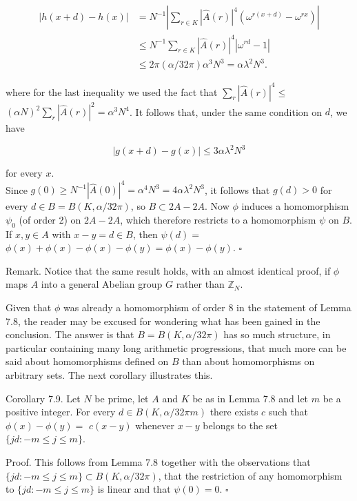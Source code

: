 \documentclass[10pt]{article}
\begin{document}
$$
\begin{aligned}
|h(x+d)-h(x)|
&=N^{-1}\left|\sum_{r\in K}|\hat{A}(r)|^{4}
  \left(\omega^{r(x+d)}-\omega^{rx}\right)\right| \\
&\leqslant N^{-1}\sum_{r\in K}|\hat{A}(r)|^{4}
  \left|\omega^{rd}-1\right| \\
&\leqslant 2\pi(\alpha/32\pi)\alpha^{3}N^{3}
 =\alpha\lambda^{2}N^{3}.
\end{aligned}
$$

where for the last inequality we used the fact that $\sum_{r}|\hat{A}(r)|^{4} \leqslant$ $(\alpha N)^{2} \sum_{r}|\hat{A}(r)|^{2}=\alpha^{3} N^{4}$. It follows that, under the same condition on $d$, we have

$$
|g(x+d)-g(x)| \leqslant 3 \alpha \lambda^{2} N^{3}
$$

for every $x$.\\
Since $g(0) \geqslant N^{-1}|\hat{A}(0)|^{4}=\alpha^{4} N^{3}=4 \alpha \lambda^{2} N^{3}$, it follows that $g(d)>0$ for every $d \in B=B(K, \alpha / 32 \pi)$, so $B \subset 2 A-2 A$. Now $\phi$ induces a homomorphism $\psi_{0}$ (of order 2) on $2 A-2 A$, which therefore restricts to a homomorphism $\psi$ on $B$. If $x, y \in A$ with $x-y=d \in B$, then $\psi(d)=$ $\phi(x)+\phi(x)-\phi(x)-\phi(y)=\phi(x)-\phi(y)$. \(\square\)

Remark. Notice that the same result holds, with an almost identical proof, if $\phi$ maps $A$ into a general Abelian group $G$ rather than $\mathbb{Z}_{N}$.

Given that $\phi$ was already a homomorphism of order 8 in the statement of Lemma 7.8, the reader may be excused for wondering what has been gained in the conclusion. The answer is that $B=B(K, \alpha / 32 \pi)$ has so much structure, in particular containing many long arithmetic progressions, that much more can be said about homomorphisms defined on $B$ than about homomorphisms on arbitrary sets. The next corollary illustrates this.

Corollary 7.9. Let $N$ be prime, let $A$ and $K$ be as in Lemma 7.8 and let $m$ be a positive integer. For every $d \in B(K, \alpha / 32 \pi m)$ there exists $c$ such that $\phi(x)-\phi(y)=$ $c(x-y)$ whenever $x-y$ belongs to the set $\{j d:-m \leqslant j \leqslant m\}$.

Proof. This follows from Lemma 7.8 together with the observations that $\{j d:-m \leqslant j \leqslant m\} \subset B(K, \alpha / 32 \pi)$, that the restriction of any homomorphism to $\{j d:-m \leqslant j \leqslant m\}$ is linear and that $\psi(0)=0$. \(\square\)
\end{document}
